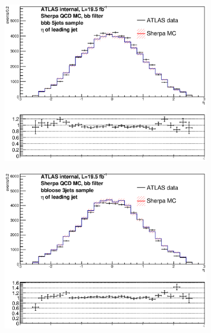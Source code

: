 \begin{figure}[phtb!]
\begin{center}
  \begin{subfigure}[$bbb$ 5+ jet category]{0.3\textwidth}\includegraphics[width=\textwidth]{MonteCarlo/figures/eta0_bbb_5jets.eps}\end{subfigure}
  \begin{subfigure}[$bbloose$ 3 jet category]{0.3\textwidth}\includegraphics[width=\textwidth]{MonteCarlo/figures/eta0_bbloose_3jets.eps}\end{subfigure}

\end{center}
\end{figure}
